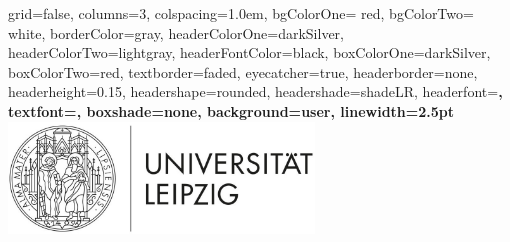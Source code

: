 \documentclass[portrate,paperwidth=841mm,paperheight=1189mm,fontscale=0.4,margin=1cm]{baposter}
\begin{document}
\begin{poster}%
  {
  grid=false, %
  columns=3,
  colspacing=1.0em,
  bgColorOne= red, %
  bgColorTwo= white, %
  borderColor=gray, %
  headerColorOne=darkSilver, %
  headerColorTwo=lightgray, 
  headerFontColor=black, %
  boxColorOne=darkSilver, %
  boxColorTwo=red, %
  textborder=faded,
  eyecatcher=true,
  headerborder=none, %
  headerheight=0.15\textheight,
  headershape=rounded, %
  headershade=shadeLR,
  headerfont=\LARGE\bf,  %
  textfont={\color{black}\setlength{\parindent}{1.5em}},
  boxshade=none, %
  background=user, %
  linewidth=2.5pt
  }
  {
      \includegraphics[height=8.0em]{uni_leipzig-logo.jpg}\\
      
}
\end{poster}
\end{document}
